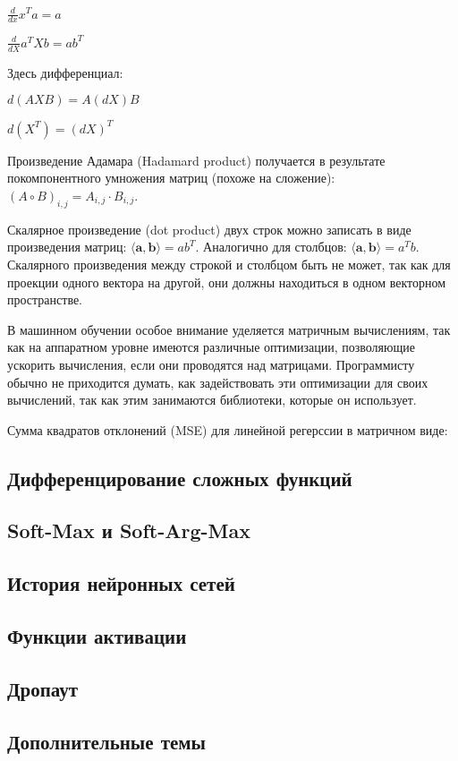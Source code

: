 $\frac{d}{dx} x^T a = a$

$\frac{d}{dX} a^T X b = a b^T$

Здесь дифференциал:

$d(AXB) = A(dX)B$

$d(X^T) = (dX)^T$

Произведение Адамара (Hadamard product) получается в результате покомпонентного
умножения матриц (похоже на сложение): $(A \circ B)_{i,j} = A_{i,j} \cdot B_{i,j}$.

Скалярное произведение (dot product) двух строк можно записать в виде
произведения матриц: $\langle \bm{a}, \bm{b} \rangle = a b^T$. Аналогично для
столбцов: $\langle \bm{a}, \bm{b} \rangle = a^T b$. Скалярного произведения
между строкой и столбцом быть не может, так как для проекции одного вектора на
другой, они должны находиться в одном векторном пространстве.

В машинном обучении особое внимание уделяется матричным вычислениям, так как на
аппаратном уровне имеются различные оптимизации, позволяющие ускорить
вычисления, если они проводятся над матрицами. Программисту обычно не
приходится думать, как задействовать эти оптимизации для своих вычислений, так
как этим занимаются библиотеки, которые он использует.

Сумма квадратов отклонений (MSE) для линейной регерссии в матричном виде:



\subsection{Дифференцирование сложных функций}

\subsection{Soft-Max и Soft-Arg-Max}

\subsection{История нейронных сетей}

\subsection{Функции активации}

\subsection{Дропаут}

\subsection{Дополнительные темы}



